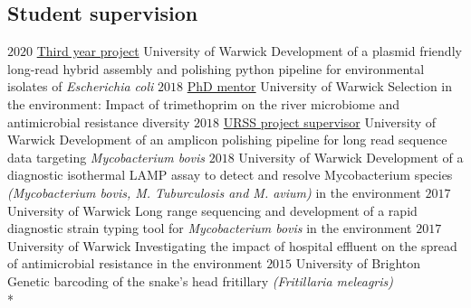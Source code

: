 \documentclass[hidelinks]{james-cv} %
\begin{document}
\subsection{Student supervision}
\hspace{-22\parskip}\begin{sentrylist}

\entr
{$2020$}
{\bodyfontsc\color{blue}\href{https://github.com/BadgerRob/Staging/blob/master/wrench.py}{Third year project}}
{University of Warwick}
{Development of a plasmid friendly long-read hybrid assembly and polishing python pipeline for environmental isolates of \textit{Escherichia coli}}
\entr
{$2018$}
{\bodyfontsc\color{blue}\href{https://www.biorxiv.org/content/10.1101/2020.06.05.133348v1}{PhD mentor}}
{University of Warwick}
{Selection in the environment: Impact of trimethoprim on the river microbiome and antimicrobial resistance diversity}
\entr
{$2018$}
{\bodyfontsc\color{blue}\href{https://www.biorxiv.org/content/10.1101/791129v2}{URSS project supervisor}}
{University of Warwick}
{Development of an amplicon polishing pipeline for long read sequence data targeting \textit {Mycobacterium bovis}}
\entr
{$2018$}
{}
{University of Warwick}
{Development of a diagnostic isothermal LAMP assay to detect and resolve Mycobacterium species\textit{ (Mycobacterium bovis, M. Tuburculosis and M. avium) } in the environment}
\entr
{$2017$}
{}
{University of Warwick}
{Long range sequencing and development of a rapid diagnostic strain typing tool for \textit{Mycobacterium bovis} in the environment}
\entr
{$2017$}
{}
{University of Warwick}
{Investigating the impact of hospital effluent on the spread of antimicrobial resistance in the environment}
\entr
{$2015$}
{}
{University of Brighton}
{Genetic barcoding of the snake's head fritillary \textit{(Fritillaria meleagris)}}\\*

\end{sentrylist}
\end{document}
